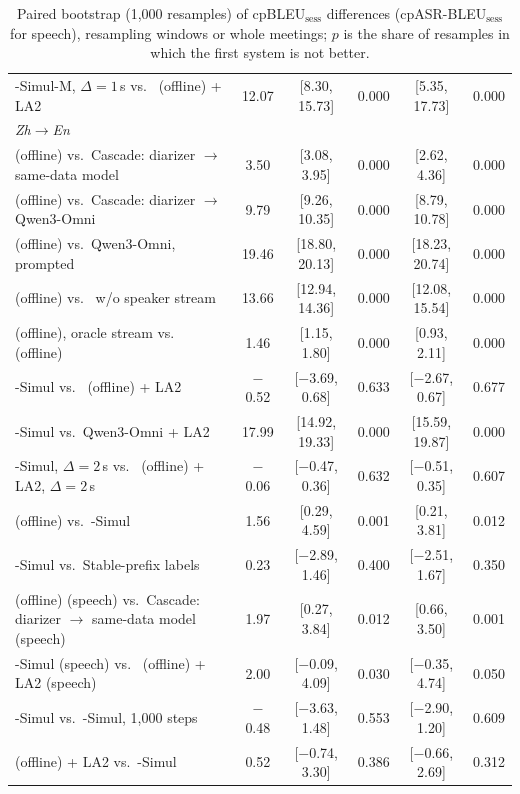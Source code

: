 \begin{table}[t]
{\begin{tabular}{lccccc}
\sys{}-Simul-M, $\Delta{=}1$\,s vs.\ \sys{} (offline) + LA2 & 12.07 & [8.30, 15.73] & 0.000 & [5.35, 17.73] & 0.000 \\
\multicolumn{6}{l}{\emph{Zh$\rightarrow$En}} \\
\sys{} (offline) vs.\ Cascade: diarizer $\rightarrow$ same-data model & 3.50 & [3.08, 3.95] & 0.000 & [2.62, 4.36] & 0.000 \\
\sys{} (offline) vs.\ Cascade: diarizer $\rightarrow$ Qwen3-Omni & 9.79 & [9.26, 10.35] & 0.000 & [8.79, 10.78] & 0.000 \\
\sys{} (offline) vs.\ Qwen3-Omni, prompted & 19.46 & [18.80, 20.13] & 0.000 & [18.23, 20.74] & 0.000 \\
\sys{} (offline) vs.\ \sys{} w/o speaker stream & 13.66 & [12.94, 14.36] & 0.000 & [12.08, 15.54] & 0.000 \\
\sys{} (offline), oracle stream vs.\ \sys{} (offline) & 1.46 & [1.15, 1.80] & 0.000 & [0.93, 2.11] & 0.000 \\
\sys{}-Simul vs.\ \sys{} (offline) + LA2 & $-$0.52 & [$-$3.69, 0.68] & 0.633 & [$-$2.67, 0.67] & 0.677 \\
\sys{}-Simul vs.\ Qwen3-Omni + LA2 & 17.99 & [14.92, 19.33] & 0.000 & [15.59, 19.87] & 0.000 \\
\sys{}-Simul, $\Delta{=}2$\,s vs.\ \sys{} (offline) + LA2, $\Delta{=}2$\,s & $-$0.06 & [$-$0.47, 0.36] & 0.632 & [$-$0.51, 0.35] & 0.607 \\
\sys{} (offline) vs.\ \sys{}-Simul & 1.56 & [0.29, 4.59] & 0.001 & [0.21, 3.81] & 0.012 \\
\sys{}-Simul vs.\ Stable-prefix labels & 0.23 & [$-$2.89, 1.46] & 0.400 & [$-$2.51, 1.67] & 0.350 \\
\sys{} (offline) (speech) vs.\ Cascade: diarizer $\rightarrow$ same-data model (speech) & 1.97 & [0.27, 3.84] & 0.012 & [0.66, 3.50] & 0.001 \\
\sys{}-Simul (speech) vs.\ \sys{} (offline) + LA2 (speech) & 2.00 & [$-$0.09, 4.09] & 0.030 & [$-$0.35, 4.74] & 0.050 \\
\sys{}-Simul vs.\ \sys{}-Simul, 1{,}000 steps & $-$0.48 & [$-$3.63, 1.48] & 0.553 & [$-$2.90, 1.20] & 0.609 \\
\sys{} (offline) + LA2 vs.\ \sys{}-Simul & 0.52 & [$-$0.74, 3.30] & 0.386 & [$-$0.66, 2.69] & 0.312 \\
\bottomrule
\end{tabular}}
\caption{Paired bootstrap (1{,}000 resamples) of cpBLEU$_\text{sess}$ differences (cpASR-BLEU$_\text{sess}$ for
speech), resampling windows or whole meetings; $p$ is the share of resamples in which the first system is not better.}
\label{tab:sig}
\end{table}
